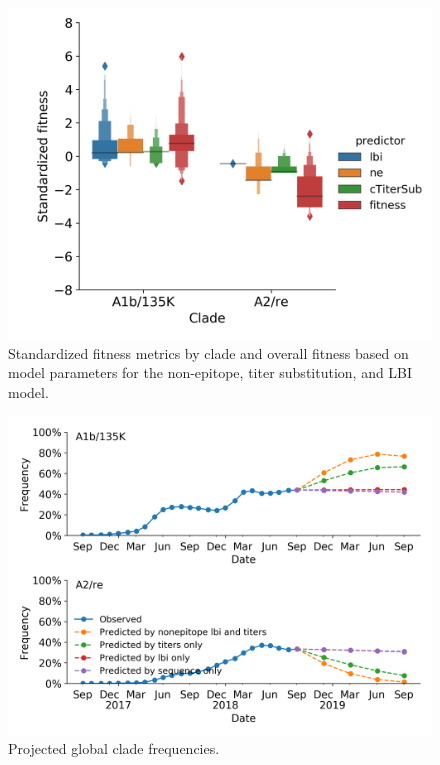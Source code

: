 \documentclass[12pt]{article}
\begin{document}
\begin{figure}
\includegraphics[width=5in]{h3n2-ha-relative-clade-fitnesses.png}
\caption{\label{fig:relative-clade-fitnesses}Standardized fitness metrics by clade and overall fitness based on model parameters for the non-epitope, titer substitution, and LBI model.}
\end{figure}

\begin{figure}
\includegraphics[width=5in]{h3n2-ha-projected-global-frequencies-by-clade.png}
\caption{\label{fig:projected-global-clade-frequencies}Projected global clade frequencies.}
\end{figure}
\end{document}
